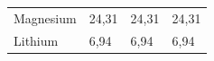 {{\begin{center}
\begin{tabular}[t]{|l|l|l|l|}
    
        Magnesium &
    
    
        24,31 &
    
    
        24,31 &
    
    
        24,31%
     \tabularnewline\cline{1-1}\cline{2-2}\cline{3-3}\cline{4-4}
    
    
        Lithium &
    
    
        6,94 &
    
    
        6,94 &
    
    
        6,94%
     \tabularnewline\cline{1-1}\cline{2-2}\cline{3-3}\cline{4-4}
    

\end{tabular}
\end{center}}}
